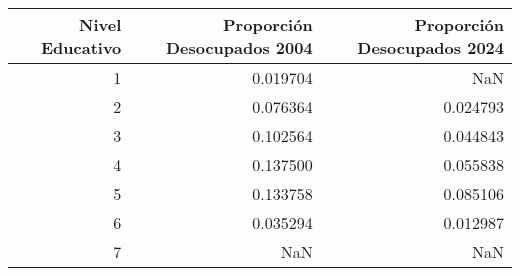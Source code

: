 \begin{tabular}{rrr}
\toprule
Nivel Educativo & Proporción Desocupados 2004 & Proporción Desocupados 2024 \\
\midrule
1 & 0.019704 & NaN \\
2 & 0.076364 & 0.024793 \\
3 & 0.102564 & 0.044843 \\
4 & 0.137500 & 0.055838 \\
5 & 0.133758 & 0.085106 \\
6 & 0.035294 & 0.012987 \\
7 & NaN & NaN \\
\bottomrule
\end{tabular}
